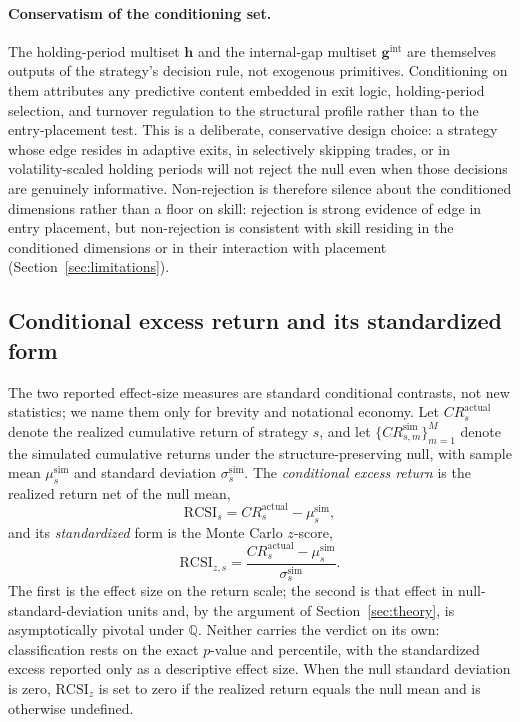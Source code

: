 \documentclass[preprint,12pt]{elsarticle}
\theoremstyle{definition}
\begin{document}
\paragraph{Conservatism of the conditioning set.} The holding-period multiset $\mathbf{h}$ and the internal-gap multiset $\mathbf{g}^{\mathrm{int}}$ are themselves outputs of the strategy's decision rule, not exogenous primitives. Conditioning on them attributes any predictive content embedded in exit logic, holding-period selection, and turnover regulation to the structural profile rather than to the entry-placement test. This is a deliberate, conservative design choice: a strategy whose edge resides in adaptive exits, in selectively skipping trades, or in volatility-scaled holding periods will not reject the null even when those decisions are genuinely informative. Non-rejection is therefore silence about the conditioned dimensions rather than a floor on skill: rejection is strong evidence of edge in entry placement, but non-rejection is consistent with skill residing in the conditioned dimensions or in their interaction with placement (Section~\ref{sec:limitations}).

\subsection{Conditional excess return and its standardized form}

The two reported effect-size measures are standard conditional contrasts, not new statistics; we name them only for brevity and notational economy. Let \(CR_s^{\mathrm{actual}}\) denote the realized cumulative return of strategy \(s\), and let \(\{CR_{s,m}^{\mathrm{sim}}\}_{m=1}^{M}\) denote the simulated cumulative returns under the structure-preserving null, with sample mean \(\mu_s^{\mathrm{sim}}\) and standard deviation \(\sigma_s^{\mathrm{sim}}\). The \emph{conditional excess return} is the realized return net of the null mean,
\begin{equation}
\mathrm{RCSI}_s = CR_s^{\mathrm{actual}} - \mu_s^{\mathrm{sim}},
\end{equation}
and its \emph{standardized} form is the Monte Carlo $z$-score,
\begin{equation}
\mathrm{RCSI}_{z,s}=\frac{CR_s^{\mathrm{actual}}-\mu_s^{\mathrm{sim}}}{\sigma_s^{\mathrm{sim}}}.
\end{equation}
The first is the effect size on the return scale; the second is that effect in null-standard-deviation units and, by the argument of Section~\ref{sec:theory}, is asymptotically pivotal under $\mathbb{Q}$. Neither carries the verdict on its own: classification rests on the exact $p$-value and percentile, with the standardized excess reported only as a descriptive effect size. When the null standard deviation is zero, $\mathrm{RCSI}_z$ is set to zero if the realized return equals the null mean and is otherwise undefined.
\end{document}
